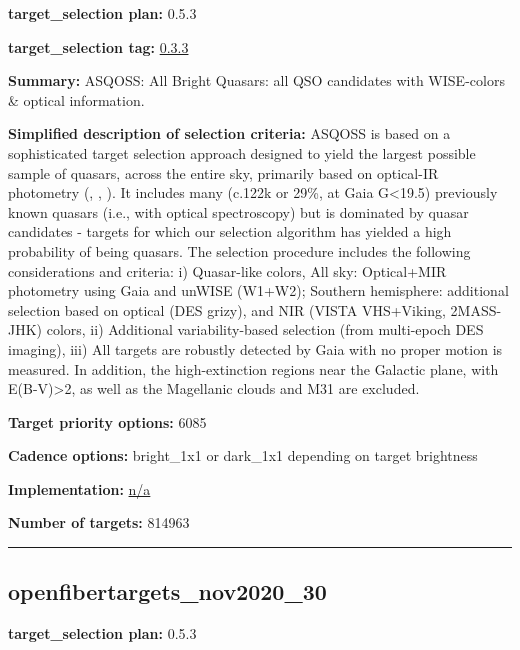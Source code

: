 \noindent\textbf{target\_selection plan:} 0.5.3

\noindent\textbf{target\_selection tag:}
\href{https://github.com/sdss/target_selection/tree/0.3.3/}{0.3.3}

\noindent\textbf{Summary:} ASQOSS: All Bright Quasars: all QSO candidates with
WISE-colors \& optical information.

\noindent\textbf{Simplified description of selection criteria:} ASQOSS is based
on a sophisticated target selection approach designed to yield the
largest possible sample of quasars, across the entire sky, primarily
based on optical-IR photometry
(\citealt{Yang2017},
\citealt{Shu2019},
\citealt{Yang2023}). It includes many (c.122k or 29\%, at Gaia
G\textless19.5) previously known quasars (i.e., with optical
spectroscopy) but is dominated by quasar candidates - targets for which
our selection algorithm has yielded a high probability of being quasars.
The selection procedure includes the following considerations and
criteria: i) Quasar-like colors, All sky: Optical+MIR photometry using
Gaia and unWISE (W1+W2); Southern hemisphere: additional selection based
on optical (DES grizy), and NIR (VISTA VHS+Viking, 2MASS-JHK) colors,
ii) Additional variability-based selection (from multi-epoch DES
imaging), iii) All targets are robustly detected by Gaia with no proper
motion is measured. In addition, the high-extinction regions near the
Galactic plane, with E(B-V)\textgreater2, as well as the Magellanic
clouds and M31 are excluded.


\noindent\textbf{Target priority options:} 6085

\noindent\textbf{Cadence options:} bright\_1x1 or dark\_1x1 depending on target
brightness

\noindent\textbf{Implementation:}
\href{https://github.com/sdss/target_selection/blob/0.3.3/python/target_selection/cartons/n/a}{n/a}

\noindent\textbf{Number of targets:} 814963

\begin{center}\rule{0.5\linewidth}{0.5pt}\end{center}

\hypertarget{openfibertargets_nov2020_30_plan0.5.3}{%
\subsection{openfibertargets\_nov2020\_30}\label{openfibertargets_nov2020_30_plan0.5.3}}

\noindent\textbf{target\_selection plan:} 0.5.3

